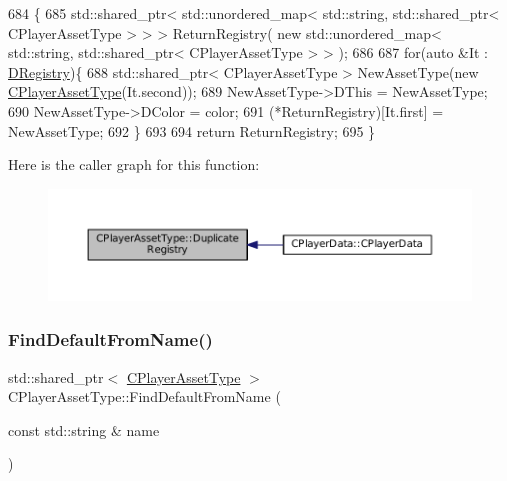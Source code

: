 \begin{DoxyCode}
684                                                                                                            
                                  \{
685     std::shared\_ptr< std::unordered\_map< std::string, std::shared\_ptr< CPlayerAssetType > > > 
      ReturnRegistry( \textcolor{keyword}{new} std::unordered\_map< std::string, std::shared\_ptr< CPlayerAssetType > > );
686     
687     \textcolor{keywordflow}{for}(\textcolor{keyword}{auto} &It : \hyperlink{classCPlayerAssetType_a24f4ccd06fbddacc936e31a2f1f12ed5}{DRegistry})\{
688         std::shared\_ptr< CPlayerAssetType > NewAssetType(\textcolor{keyword}{new} \hyperlink{classCPlayerAssetType_a2f8429c4ef261d52ea6ded8d7b4e09ee}{CPlayerAssetType}(It.second));
689         NewAssetType->DThis = NewAssetType;
690         NewAssetType->DColor = color;
691         (*ReturnRegistry)[It.first] = NewAssetType;
692     \}
693 
694     \textcolor{keywordflow}{return} ReturnRegistry;
695 \}
\end{DoxyCode}
Here is the caller graph for this function\+:\nopagebreak
\begin{figure}[H]
\begin{center}
\leavevmode
\includegraphics[width=350pt]{classCPlayerAssetType_a6dfbccbbed7fecec6b7e2c51ac22fe5a_icgraph}
\end{center}
\end{figure}
\hypertarget{classCPlayerAssetType_a7e1684eac4efaf7afe9a5c15af262b33}{}\label{classCPlayerAssetType_a7e1684eac4efaf7afe9a5c15af262b33} 
\subsubsection{\texorpdfstring{Find\+Default\+From\+Name()}{FindDefaultFromName()}}
{\footnotesize\ttfamily std\+::shared\+\_\+ptr$<$ \hyperlink{classCPlayerAssetType}{C\+Player\+Asset\+Type} $>$ C\+Player\+Asset\+Type\+::\+Find\+Default\+From\+Name (\begin{DoxyParamCaption}\item[{const std\+::string \&}]{name }\end{DoxyParamCaption})\hspace{0.3cm}{\ttfamily [static]}}



